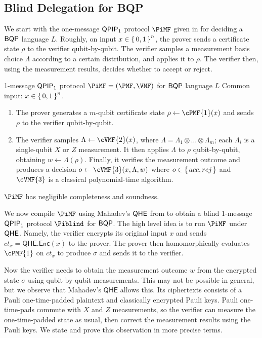 \subsection{Blind Delegation for BQP}
\label{subsec:BlindBQP}

We start with the one-message $\operatorname{\mathsf{QPIP}}_1$ protocol $\PiMF$ given in \cite{mf16} for deciding a $\operatorname{\mathsf{BQP}}$ language $L$.
Roughly, on input $x\in\set{0,1}^n$, the prover sends a certificate state $\rho$ to the verifier qubit-by-qubit.
The verifier samples a measurement basis choice $\Lambda$ according to a certain distribution, and applies it to $\rho$.
The verifier then, using the measurement results, decides whether to accept or reject.

\begin{protocol}{1-message $\operatorname{\mathsf{QPIP}}_1$ protocol $\PiMF = (\PMF, \VMF)$ for $\operatorname{\mathsf{BQP}}$ language $L$}
	\label{proto:BQP}
	Common input: $x\in\set{0,1}^n$. 
	\begin{enumerate}
		\item The prover generates a $m$-qubit certificate state $\rho\leftarrow\cPMF{1}(x)$ and sends $\rho$ to the verifier qubit-by-qubit.
		\item The verifier samples $\Lambda \leftarrow \cVMF{2}(x)$, where $\Lambda=\Lambda_1\otimes\ldots\otimes\Lambda_m$;
			each $\Lambda_i$ is a single-qubit $X$ or $Z$ measurement.
			It then applies $\Lambda$ to $\rho$ qubit-by-qubit, obtaining $w\leftarrow\Lambda(\rho)$.
			Finally, it verifies the measurement outcome and produces a decision $o\leftarrow\cVMF{3}(x, \Lambda, w)$ where $o\in\set{acc, rej}$ and $\cVMF{3}$ is a classical polynomial-time algorithm.
	\end{enumerate}
\end{protocol}
\begin{thm}
    $\PiMF$ has negligible completeness and soundness.
\end{thm}

We now compile $\PiMF$ using Mahadev's $\mathsf{QHE}$ from \cite{mahadev_qfhe} to obtain a blind 1-message $\operatorname{\mathsf{QPIP}}_1$ protocol $\Piblind$ for $\operatorname{\mathsf{BQP}}$.
The high level idea is to run $\PiMF$ under $\mathsf{QHE}$.
Namely, the verifier encrypts its original input $x$ and sends $ct_x=\mathsf{QHE.Enc}(x)$ to the prover.
The prover then homomorphically evaluates $\cPMF{1}$ on $ct_x$ to produce $\sigma$ and sends it to the verifier.

Now the verifier needs to obtain the measurement outcome $w$ from the encrypted state $\sigma$ using qubit-by-qubit measurements.
This may not be possible in general, but we observe that Mahadev's $\mathsf{QHE}$ allows this. 
Its ciphertexts consists of a Pauli one-time-padded plaintext and classically encrypted Pauli keys.
Pauli one-time-pads commute with $X$ and $Z$ measurements, so the verifier can measure the one-time-padded state as usual, then correct the measurement results using the Pauli keys.
We state and prove this observation in more precise terms.

